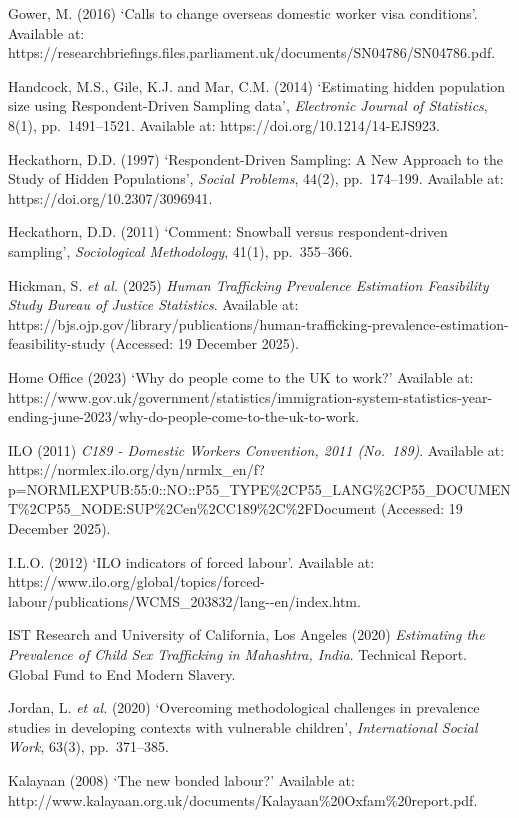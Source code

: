 \documentclass[
  12pt,
  letterpaper,
  DIV=11,
  numbers=noendperiod]{scrartcl}
\begin{document}
Gower, M. (2016) `Calls to change overseas domestic worker visa
conditions'. Available at:
https://researchbriefings.files.parliament.uk/documents/SN04786/SN04786.pdf.

Handcock, M.S., Gile, K.J. and Mar, C.M. (2014) `Estimating hidden
population size using Respondent-Driven Sampling data', \emph{Electronic
Journal of Statistics}, 8(1), pp.~1491--1521. Available at:
https://doi.org/10.1214/14-EJS923.

Heckathorn, D.D. (1997) `Respondent-Driven Sampling: A New Approach to
the Study of Hidden Populations', \emph{Social Problems}, 44(2),
pp.~174--199. Available at: https://doi.org/10.2307/3096941.

Heckathorn, D.D. (2011) `Comment: Snowball versus respondent-driven
sampling', \emph{Sociological Methodology}, 41(1), pp.~355--366.

Hickman, S. \emph{et al.} (2025) \emph{Human Trafficking Prevalence
Estimation Feasibility Study \textbar{} Bureau of Justice Statistics}.
Available at:
https://bjs.ojp.gov/library/publications/human-trafficking-prevalence-estimation-feasibility-study
(Accessed: 19 December 2025).

Home Office (2023) `Why do people come to the UK to work?' Available at:
https://www.gov.uk/government/statistics/immigration-system-statistics-year-ending-june-2023/why-do-people-come-to-the-uk-to-work.

ILO (2011) \emph{C189 - Domestic Workers Convention, 2011 (No.~189)}.
Available at:
https://normlex.ilo.org/dyn/nrmlx\_en/f?p=NORMLEXPUB:55:0::NO::P55\_TYPE\%2CP55\_LANG\%2CP55\_DOCUMENT\%2CP55\_NODE:SUP\%2Cen\%2CC189\%2C\%2FDocument
(Accessed: 19 December 2025).

I.L.O. (2012) `ILO indicators of forced labour'. Available at:
https://www.ilo.org/global/topics/forced-labour/publications/WCMS\_203832/lang-\/-en/index.htm.

IST Research and University of California, Los Angeles (2020)
\emph{Estimating the Prevalence of Child Sex Trafficking in Mahashtra,
India}. Technical Report. Global Fund to End Modern Slavery.

Jordan, L. \emph{et al.} (2020) `Overcoming methodological challenges in
prevalence studies in developing contexts with vulnerable children',
\emph{International Social Work}, 63(3), pp.~371--385.

Kalayaan (2008) `The new bonded labour?' Available at:
http://www.kalayaan.org.uk/documents/Kalayaan\%20Oxfam\%20report.pdf.
\end{document}
